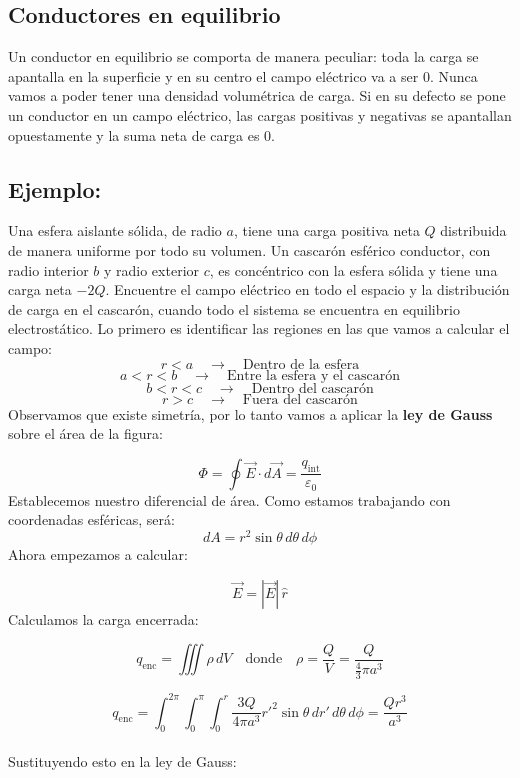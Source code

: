 \documentclass[a4paper,12pt]{article}
\begin{document}
\subsection{Conductores en equilibrio}
\noindent
Un conductor en equilibrio se comporta de manera peculiar: toda la carga se apantalla en la superficie y en su centro el campo eléctrico va a ser $0$.
\noindent
Nunca vamos a poder tener una densidad volumétrica de carga.
\noindent
Si en su defecto se pone un conductor en un campo eléctrico, las cargas positivas y negativas se apantallan opuestamente y la suma neta de carga es $0$.

\subsection*{Ejemplo:}
\noindent
Una esfera aislante sólida, de radio $a$, tiene una carga positiva neta $Q$ distribuida de manera uniforme por todo su volumen.  
Un cascarón esférico conductor, con radio interior $b$ y radio exterior $c$, es concéntrico con la esfera sólida y tiene una carga neta $-2Q$.  
Encuentre el campo eléctrico en todo el espacio y la distribución de carga en el cascarón, cuando todo el sistema se encuentra en equilibrio electrostático.
\newpage
\noindent
Lo primero es identificar las regiones en las que vamos a calcular el campo:
\[
r < a \quad \rightarrow \quad \text{Dentro de la esfera}
\]
\[
a < r < b \quad \rightarrow \quad \text{Entre la esfera y el cascarón}
\]
\[
b < r < c \quad \rightarrow \quad \text{Dentro del cascarón}
\]
\[
r > c \quad \rightarrow \quad \text{Fuera del cascarón}
\]
Observamos que existe simetría, por lo tanto vamos a aplicar la \textbf{ley de Gauss} sobre el área de la figura:

\[
\Phi = \oint \vec E \cdot d\vec A = \frac{q_{\text{int}}}{\varepsilon_0}
\]
Establecemos nuestro diferencial de área. Como estamos trabajando con coordenadas esféricas, será:
\[
dA = r^2 \sin\theta\, d\theta\, d\phi
\]
Ahora empezamos a calcular:

\[
\vec E = |\vec E|\,\hat r
\]
Calculamos la carga encerrada:

\[
q_{\text{enc}} = \iiint \rho\, dV \quad \text{donde} \quad \rho = \frac{Q}{V} = \frac{Q}{\frac{4}{3}\pi a^3}
\]

\[
q_{\text{enc}} = \int_{0}^{2\pi}\!\!\int_{0}^{\pi}\!\!\int_{0}^{r} \frac{3Q}{4\pi a^3} r'^2 \sin\theta\, dr'\, d\theta\, d\phi 
= \frac{Q r^3}{a^3}
\]\\
Sustituyendo esto en la ley de Gauss:
\end{document}
